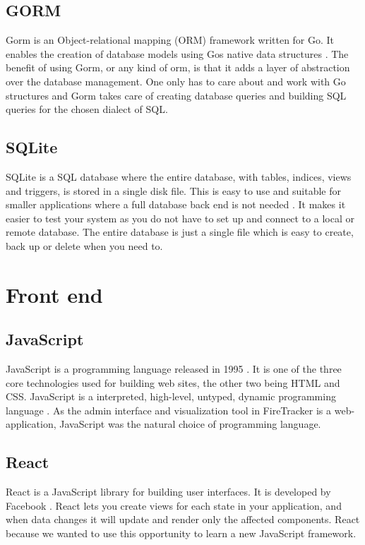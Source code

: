 \documentclass[../Main/thesis.tex]{subfiles}
\begin{document}
\subsection{GORM}
Gorm is an Object-relational mapping (ORM) framework written for Go.
It enables the creation of database models using Gos native data structures \citep{JInzhuZhang2018}.
The benefit of using Gorm, or any kind of orm, is that it adds a layer of abstraction over the database management.
One only has to care about and work with Go structures and Gorm takes care of creating database queries and building SQL queries for the chosen dialect of SQL.

\subsection{SQLite}
SQLite is a SQL database where the entire database, with tables, indices, views and triggers, is stored in a single disk file.
This is easy to use and suitable for smaller applications where a full database back end is not needed \citep{Hipp2015}.
It makes it easier to test your system as you do not have to set up and connect to a local or remote database.
The entire database is just a single file which is easy to create, back up or delete when you need to.

\section{Front end}
\subsection{JavaScript}
JavaScript is a programming language released in 1995 \citep{Netscape1995}.
It is one of the three core technologies used for building web sites, the other two being HTML and CSS.
JavaScript is a interpreted, high-level, untyped, dynamic programming language \citep{Flanagan2011}.
As the admin interface and visualization tool in FireTracker is a web-application, JavaScript was the natural choice of programming language.

\subsection{React}
React is a JavaScript library for building user interfaces.
It is developed by Facebook \citep{FacebookInc.2014}.
React lets you create views for each state in your application, and when data changes it will update and render only the affected components.
React because we wanted to use this opportunity to learn a new JavaScript framework.
\end{document}
